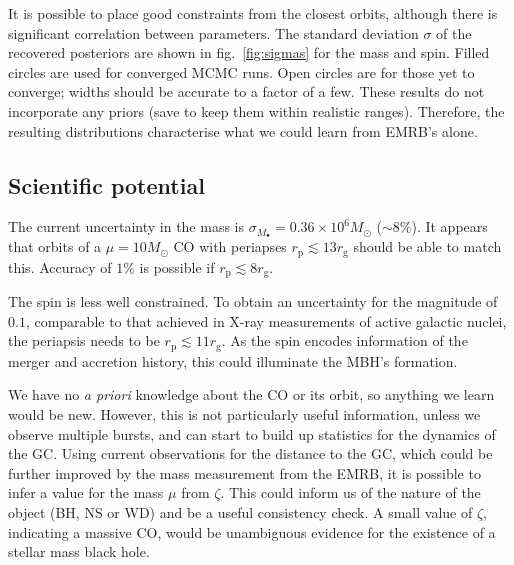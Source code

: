 \documentclass[11pt,twoside]{article}
\begin{document}
It is possible to place good constraints from the closest orbits, although there is significant correlation between parameters. The standard deviation $\sigma$ of the recovered posteriors are shown in fig.~\ref{fig:sigmas} for the mass and spin. Filled circles are used for converged MCMC runs. Open circles are for those yet to converge; widths should be accurate to a factor of a few.
These results do not incorporate any priors (save to keep them within realistic ranges). Therefore, the resulting distributions characterise what we could learn from EMRB's alone.

\subsection{Scientific potential}

The current uncertainty in the mass is $\sigma_{M_\bullet} = 0.36 \times 10^6 M_\odot$ ($\sim 8\%$). It appears that orbits of a $\mu = 10 M_\odot$ CO with periapses $r_\mathrm{p} \lesssim 13 r_\mathrm{g}$ should be able to match this. Accuracy of $1\%$ is possible if $r_\mathrm{p} \lesssim 8 r_\mathrm{g}$.

The spin is less well constrained. To obtain an uncertainty for the magnitude of $0.1$, comparable to that achieved in X-ray measurements of active galactic nuclei, the periapsis needs to be $r_\mathrm{p} \lesssim 11 r_\mathrm{g}$. As the spin encodes information of the merger and accretion history, this could illuminate the MBH's formation.

We have no {\it a priori} knowledge about the CO or its orbit, so anything we learn would be new. However, this is not particularly useful information, unless we observe multiple bursts, and can start to build up statistics for the dynamics of the GC. Using current observations for the distance to the GC, which could be further improved by the mass measurement from the EMRB, it is possible to infer a value for the mass $\mu$ from $\zeta$. This could inform us of the nature of the object (BH, NS or WD) and be a useful consistency check. A small value of $\zeta$, indicating a massive CO, would be unambiguous evidence for the existence of a stellar mass black hole.



\end{document}
